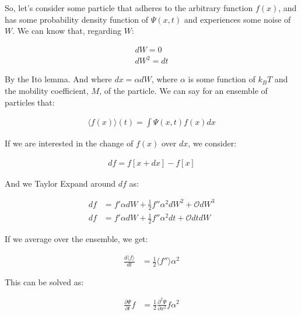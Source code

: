 So, let's consider some particle that adheres to the arbitrary function $f(x)$, and has some probability density function of $\Psi(x,t)$ and experiences some noise of $W$. We can know that, regarding $W$:

\begin{equation}
\begin{split}
    dW = 0 \\
    dW^2 = dt
\end{split}
\end{equation}

By the It$\overline{\mathrm{o}}$ lemma. And where $dx = \alpha dW$, where $\alpha$ is some function of $k_BT$ and the mobility coefficient, $M$, of the particle. We can say for an ensemble of particles that: 

\begin{equation}
\begin{split}
    \langle f(x) \rangle(t) = \int \Psi(x,t) f(x) dx
\end{split}
\end{equation}

If we are interested in the change of $f(x)$ over $dx$, we consider: 

\begin{equation}
\begin{split}
    df = f[x + dx] - f[x] 
\end{split}
\end{equation}

And we Taylor Expand around $df$ as: 

\begin{equation}
\begin{split}
    df & = f'\alpha dW + \frac{1}{2}f''\alpha^2 dW^2 + \mathcal{O}dW^3 \\
    df & = f'\alpha dW + \frac{1}{2}f''\alpha^2 dt + \mathcal{O}dtdW
\end{split}
\end{equation}

If we average over the ensemble, we get: 

\begin{equation}
\begin{split}
    \frac{d\langle f \rangle}{dt} & = \frac{1}{2}\langle f'' \rangle \alpha^2 
\end{split}
\end{equation}

This can be solved as: 

\begin{equation}
\begin{split}
    \frac{\partial \Psi}{\partial t}f & = \frac{1}{2} \frac{\partial^2 \Psi}{\partial x^2}f \alpha^2
\end{split}
\end{equation}

